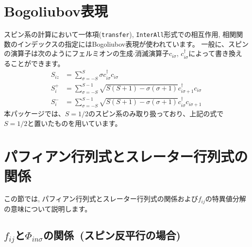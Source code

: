 \section{Bogoliubov表現}\label{sec_bogoliubov_rep}

スピン系の計算において一体項(\verb|transfer|), \verb|InterAll|形式での相互作用, 
相関関数のインデックスの指定にはBogoliubov表現が使われています。
一般に、スピンの演算子は次のようにフェルミオンの生成$\cdot$消滅演算子$c_{i \sigma}$,
$c_{i \sigma}^\dagger$によって書き換えることができます。
\begin{align}
  S_{i z} &= \sum_{\sigma = -S}^{S} \sigma c_{i \sigma}^\dagger c_{i \sigma}
  \\
  S_{i}^+ &= \sum_{\sigma = -S}^{S-1} 
  \sqrt{S(S+1) - \sigma(\sigma+1)} 
  c_{i \sigma+1}^\dagger c_{i \sigma}
  \\
  S_{i}^- &= \sum_{\sigma = -S}^{S-1} 
  \sqrt{S(S+1) - \sigma(\sigma+1)} 
  c_{i \sigma}^\dagger c_{i \sigma+1}
\end{align}
本パッケージでは、$S=1/2$のスピン系のみ取り扱っており、上記の式で
$S=1/2$と置いたものを用いています。

\section{{パフィアン行列式とスレーター行列式の関係}}
\label{sec:PuffAndSlater}

この節では, パフィアン行列式とスレーター行列式の関係および$f_{ij}$の特異値分解の意味について説明します。

\subsection{$f_{ij}$と$\Phi_{in\sigma}$の関係~(スピン反平行の場合)}

